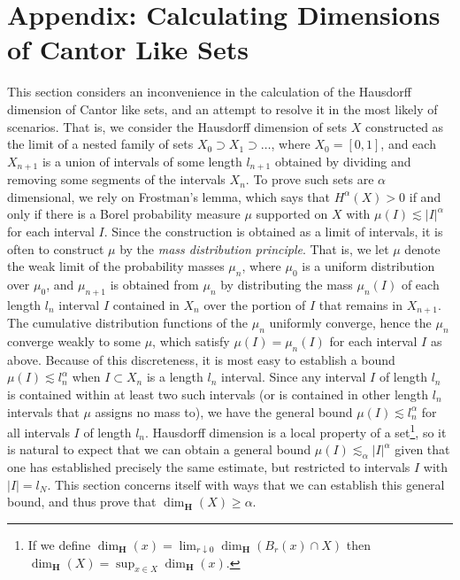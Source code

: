 \documentclass{report}
\theoremstyle{plain}
\theoremstyle{plain}
\begin{document}
\chapter{Appendix: Calculating Dimensions of Cantor Like Sets}

This section considers an inconvenience in the calculation of the Hausdorff dimension of Cantor like sets, and an attempt to resolve it in the most likely of scenarios. That is, we consider the Hausdorff dimension of sets $X$ constructed as the limit of a nested family of sets $X_0 \supset X_1 \supset \dots$, where $X_0 = [0,1]$, and each $X_{n+1}$ is a union of intervals of some length $l_{n+1}$ obtained by dividing and removing some segments of the intervals $X_n$. To prove such sets are $\alpha$ dimensional, we rely on Frostman's lemma, which says that $H^\alpha(X) > 0$ if and only if there is a Borel probability measure $\mu$ supported on $X$ with $\mu(I) \lesssim |I|^\alpha$ for each interval $I$. Since the construction is obtained as a limit of intervals, it is often to construct $\mu$ by the {\it mass distribution principle}. That is, we let $\mu$ denote the weak limit of the probability masses $\mu_n$, where $\mu_0$ is a uniform distribution over $\mu_0$, and $\mu_{n+1}$ is obtained from $\mu_n$ by distributing the mass $\mu_n(I)$ of each length $l_n$ interval $I$ contained in $X_n$ over the portion of $I$ that remains in $X_{n+1}$. The cumulative distribution functions of the $\mu_n$ uniformly converge, hence the $\mu_n$ converge weakly to some $\mu$, which satisfy $\mu(I) = \mu_n(I)$ for each interval $I$ as above. Because of this discreteness, it is most easy to establish a bound $\mu(I) \lesssim l_n^\alpha$ when $I \subset X_n$ is a length $l_n$ interval. Since any interval $I$ of length $l_n$ is contained within at least two such intervals (or is contained in other length $l_n$ intervals that $\mu$ assigns no mass to), we have the general bound $\mu(I) \lesssim l_n^\alpha$ for all intervals $I$ of length $l_n$. Hausdorff dimension is a local property of a set\footnote{If we define $\dim_{\mathbf{H}}(x) = \lim_{r \downarrow 0} \dim_{\mathbf{H}}(B_r(x) \cap X)$ then $\dim_{\mathbf{H}}(X) = \sup_{x \in X} \dim_{\mathbf{H}}(x)$.}, so it is natural to expect that we can obtain a general bound $\mu(I) \lesssim_\alpha|I|^\alpha$ given that one has established precisely the same estimate, but restricted to intervals $I$ with $|I| = l_N$. This section concerns itself with ways that we can establish this general bound, and thus prove that $\dim_{\mathbf{H}}(X) \geq \alpha$.
\end{document}
